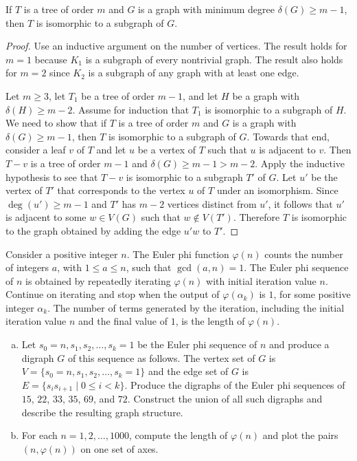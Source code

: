\begin{theorem}
If $T$ is a tree of order $m$ and $G$ is a graph with minimum degree
$\delta(G) \geq m - 1$, then $T$ is isomorphic to a subgraph of $G$.
\end{theorem}

\begin{proof}
Use an inductive argument on the number of vertices. The result holds
for $m = 1$ because $K_1$ is a subgraph of every nontrivial graph. The
result also holds for $m = 2$ since $K_2$ is a subgraph of any graph
with at least one edge.

Let $m \geq 3$, let $T_1$ be a tree of order $m - 1$, and let $H$ be a
graph with $\delta(H) \geq m - 2$. Assume for induction that $T_1$ is
isomorphic to a subgraph of $H$. We need to show that if $T$ is a tree
of order $m$ and $G$ is a graph with $\delta(G) \geq m - 1$, then $T$
is isomorphic to a subgraph of $G$. Towards that end, consider a leaf
$v$ of $T$ and let $u$ be a vertex of $T$ such that $u$ is adjacent to
$v$. Then $T - v$ is a tree of order $m - 1$ and
$\delta(G) \geq m - 1 > m - 2$. Apply the inductive hypothesis to see
that $T - v$ is isomorphic to a subgraph $T'$ of $G$. Let $u'$ be the
vertex of $T'$ that corresponds to the vertex $u$ of $T$ under an
isomorphism. Since $\deg(u') \geq m - 1$ and $T'$ has $m - 2$ vertices
distinct from $u'$, it follows that $u'$ is adjacent to some
$w \in V(G)$ such that $w \notin V(T')$. Therefore $T$ is isomorphic
to the graph obtained by adding the edge $u'w$ to $T'$.
\end{proof}

\begin{example}
\label{eg:trees_forests:Euler_phi_function_tree}
Consider a positive integer $n$. The Euler phi function $\varphi(n)$
counts the number of integers $a$, with $1 \leq a \leq n$, such that
$\gcd(a,n) = 1$. The Euler phi sequence of $n$ is obtained by
repeatedly iterating $\varphi(n)$ with initial iteration value
$n$. Continue on iterating and stop when the output of
$\varphi(\alpha_k)$ is $1$, for some positive integer $\alpha_k$. The
number of terms generated by the iteration, including the initial
iteration value $n$ and the final value of $1$, is the length of
$\varphi(n)$.
\begin{enumerate}[(a)]
\item Let $s_0=n, s_1, s_2, \dots, s_k=1$ be the Euler phi sequence of
  $n$ and produce a digraph $G$ of this sequence as follows. The
  vertex set of $G$ is $V = \{s_0=n, s_1, s_2, \dots, s_k=1\}$ and the
  edge set of $G$ is $E = \{s_i s_{i+1} \mid 0 \leq i < k\}$. Produce
  the digraphs of the Euler phi sequences of $15$, $22$, $33$, $35$,
  $69$, and $72$. Construct the union of all such digraphs and
  describe the resulting graph structure.

\item For each $n = 1, 2, \dots, 1000$, compute the length of
  $\varphi(n)$ and plot the pairs $(n, \varphi(n))$ on one set of axes.
\end{enumerate}
\end{example}

